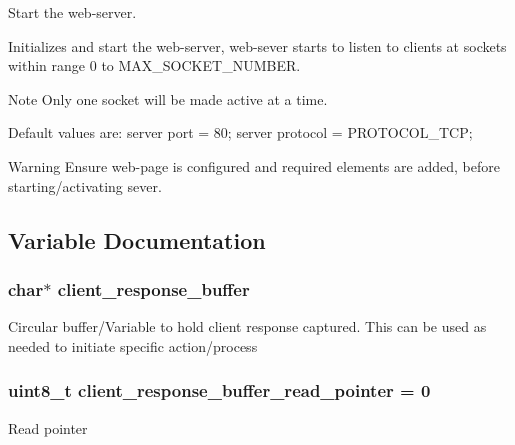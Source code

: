 Start the web-\/server. 

Initializes and start the web-\/server, web-\/sever starts to listen to clients at sockets within range 0 to M\+A\+X\+\_\+\+S\+O\+C\+K\+E\+T\+\_\+\+N\+U\+M\+B\+ER. \begin{DoxyNote}{Note}
Only one socket will be made active at a time.
\end{DoxyNote}
Default values are\+: server port = 80; server protocol = P\+R\+O\+T\+O\+C\+O\+L\+\_\+\+T\+CP;

\begin{DoxyWarning}{Warning}
Ensure web-\/page is configured and required elements are added, before starting/activating sever. 
\end{DoxyWarning}


\subsection{Variable Documentation}
\subsubsection[{\texorpdfstring{client\+\_\+response\+\_\+buffer}{client_response_buffer}}]{\setlength{\rightskip}{0pt plus 5cm}char$\ast$ client\+\_\+response\+\_\+buffer}\hypertarget{group__wireless__interface_gae1c59ff89e7cf7528ed8df534e67b568}{}\label{group__wireless__interface_gae1c59ff89e7cf7528ed8df534e67b568}
Circular buffer/\+Variable to hold client response captured. This can be used as needed to initiate specific action/process 
\subsubsection[{\texorpdfstring{client\+\_\+response\+\_\+buffer\+\_\+read\+\_\+pointer}{client_response_buffer_read_pointer}}]{\setlength{\rightskip}{0pt plus 5cm}uint8\+\_\+t client\+\_\+response\+\_\+buffer\+\_\+read\+\_\+pointer = 0}\hypertarget{group__wireless__interface_ga46a00362b669fe2b4dc08b9c2c983675}{}\label{group__wireless__interface_ga46a00362b669fe2b4dc08b9c2c983675}
Read pointer 
